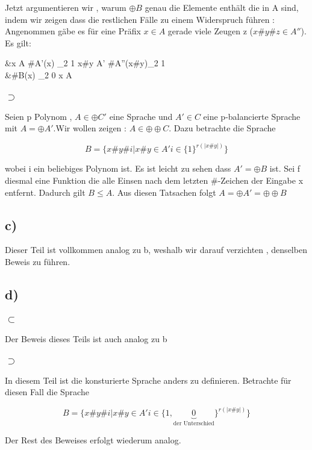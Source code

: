 \documentclass{article}
\begin{document}
			Jetzt argumentieren wir , warum $\oplus B $ genau die Elemente enthält die in A sind, indem wir zeigen dass die restlichen Fälle zu einem Widerspruch führen :\\Angenommen gäbe es für eine Präfix $x\in A$ gerade viele Zeugen z ($x\#y\#z \in A''$). Es gilt:
			
			\begin{flalign*}
			&x \in A \rightarrow \#A'(x) \equiv_2 1  x\#y \in A' \rightarrow \#A''(x\#y)\equiv_2 1\\
			&\#B(x) \equiv_2 0 \rightarrow x \notin A  \lightning
			\end{flalign*}
		\subsubsection*{$\supset$}
			Seien p Polynom , $A \in \oplus C'$ eine Sprache und $A' \in C$ eine p-balancierte Sprache mit 
			$A = \oplus A'$.Wir wollen zeigen : $A \in \oplus\oplus C$. Dazu betrachte die Sprache 
	
			\[
			B = \{ x\#y\#i | x\#y \in A' i \in \{1\}^{r(|x\#y|)} \}
			\]

			wobei i ein beliebiges Polynom ist. Es ist leicht zu sehen dass $A' = \oplus B$ ist. Sei f diesmal eine Funktion die alle Einsen nach dem letzten $\#$-Zeichen der Eingabe x entfernt. Dadurch gilt $B \leq A$. Aus diesen Tatsachen folgt $A = \oplus A' = \oplus \oplus B$

	\subsection*{c)}
		Dieser Teil ist vollkommen analog zu b, weshalb wir darauf verzichten , denselben Beweis zu führen.

	\subsection*{d)}
		\subsubsection*{$\subset$}

		Der Beweis dieses Teils ist auch analog zu b

		\subsubsection*{$\supset$}

		In diesem Teil ist die konsturierte Sprache anders zu definieren. Betrachte für diesen Fall die Sprache

		\[
			B = \{ x\#y\#i | x\#y \in A' i \in \{1,\underbrace{0}_{\text{der Unterschied}}\}^{r(|x\#y|)} \}
		\]

		Der Rest des Beweises erfolgt wiederum analog.
\end{document}

